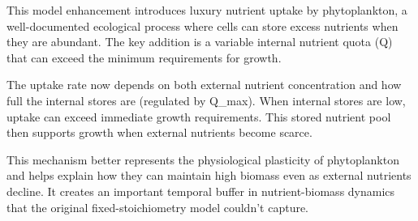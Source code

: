 This model enhancement introduces luxury nutrient uptake by phytoplankton, a well-documented ecological process where cells can store excess nutrients when they are abundant. The key addition is a variable internal nutrient quota (Q) that can exceed the minimum requirements for growth.

The uptake rate now depends on both external nutrient concentration and how full the internal stores are (regulated by Q_max). When internal stores are low, uptake can exceed immediate growth requirements. This stored nutrient pool then supports growth when external nutrients become scarce.

This mechanism better represents the physiological plasticity of phytoplankton and helps explain how they can maintain high biomass even as external nutrients decline. It creates an important temporal buffer in nutrient-biomass dynamics that the original fixed-stoichiometry model couldn't capture.
